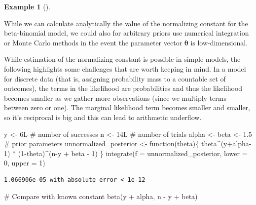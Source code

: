 \documentclass[
  11pt,
  letterpaper,
]{scrbook}
\newenvironment{Shaded}{\begin{snugshade}}{\end{snugshade}}
\newcommand{\AttributeTok}[1]{\textcolor[rgb]{0.40,0.45,0.13}{#1}}
\newcommand{\CommentTok}[1]{\textcolor[rgb]{0.37,0.37,0.37}{#1}}
\newcommand{\ControlFlowTok}[1]{\textcolor[rgb]{0.00,0.23,0.31}{#1}}
\newcommand{\DecValTok}[1]{\textcolor[rgb]{0.68,0.00,0.00}{#1}}
\newcommand{\FloatTok}[1]{\textcolor[rgb]{0.68,0.00,0.00}{#1}}
\newcommand{\FunctionTok}[1]{\textcolor[rgb]{0.28,0.35,0.67}{#1}}
\newcommand{\NormalTok}[1]{\textcolor[rgb]{0.00,0.23,0.31}{#1}}
\newcommand{\OtherTok}[1]{\textcolor[rgb]{0.00,0.23,0.31}{#1}}
\newcommand{\SpecialCharTok}[1]{\textcolor[rgb]{0.37,0.37,0.37}{#1}}
\theoremstyle{definition}
\newtheorem{example}{Example}[chapter]
\theoremstyle{definition}
\theoremstyle{definition}
\theoremstyle{plain}
\theoremstyle{remark}
\begin{document}
\begin{example}[]\protect\hypertarget{exm-numericalintegration}{}\label{exm-numericalintegration}

While we can calculate analytically the value of the normalizing
constant for the beta-binomial model, we could also for arbitrary priors
use numerical integration or Monte Carlo methods in the event the
parameter vector \(\boldsymbol{\theta}\) is low-dimensional.

While estimation of the normalizing constant is possible in simple
models, the following highlights some challenges that are worth keeping
in mind. In a model for discrete data (that is, assigning probability
mass to a countable set of outcomes), the terms in the likelihood are
probabilities and thus the likelihood becomes smaller as we gather more
observations (since we multiply terms between zero or one). The marginal
likelihood term becomes smaller and smaller, so it's reciprocal is big
and this can lead to arithmetic underflow.

\begin{Shaded}
\begin{Highlighting}[]
\NormalTok{y }\OtherTok{\textless{}{-}}\NormalTok{ 6L }\CommentTok{\# number of successes }
\NormalTok{n }\OtherTok{\textless{}{-}}\NormalTok{ 14L }\CommentTok{\# number of trials}
\NormalTok{alpha }\OtherTok{\textless{}{-}}\NormalTok{ beta }\OtherTok{\textless{}{-}} \FloatTok{1.5} \CommentTok{\# prior parameters}
\NormalTok{unnormalized\_posterior }\OtherTok{\textless{}{-}} \ControlFlowTok{function}\NormalTok{(theta)\{}
\NormalTok{  theta}\SpecialCharTok{\^{}}\NormalTok{(y}\SpecialCharTok{+}\NormalTok{alpha}\DecValTok{{-}1}\NormalTok{) }\SpecialCharTok{*}\NormalTok{ (}\DecValTok{1}\SpecialCharTok{{-}}\NormalTok{theta)}\SpecialCharTok{\^{}}\NormalTok{(n}\SpecialCharTok{{-}}\NormalTok{y }\SpecialCharTok{+}\NormalTok{ beta }\SpecialCharTok{{-}} \DecValTok{1}\NormalTok{)}
\NormalTok{\}}
\FunctionTok{integrate}\NormalTok{(}\AttributeTok{f =}\NormalTok{ unnormalized\_posterior,}
          \AttributeTok{lower =} \DecValTok{0}\NormalTok{,}
          \AttributeTok{upper =} \DecValTok{1}\NormalTok{)}
\end{Highlighting}
\end{Shaded}

\begin{verbatim}
1.066906e-05 with absolute error < 1e-12
\end{verbatim}

\begin{Shaded}
\begin{Highlighting}[]
\CommentTok{\# Compare with known constant}
\FunctionTok{beta}\NormalTok{(y }\SpecialCharTok{+}\NormalTok{ alpha, n }\SpecialCharTok{{-}}\NormalTok{ y }\SpecialCharTok{+}\NormalTok{ beta)}
\end{Highlighting}
\end{Shaded}


\end{example}
\end{document}
